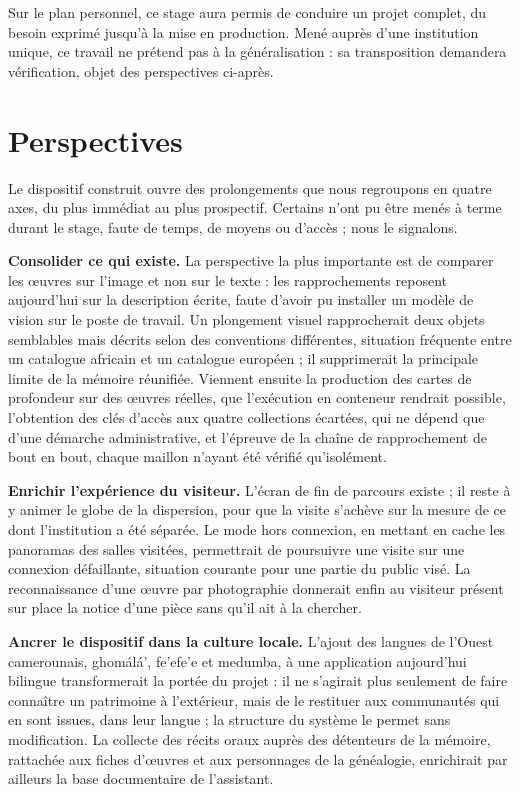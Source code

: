 Sur le plan personnel, ce stage aura permis de conduire un projet complet, du
besoin exprimé jusqu'à la mise en production. Mené auprès d'une institution
unique, ce travail ne prétend pas à la généralisation : sa transposition
demandera vérification, objet des perspectives ci-après.


\section*{Perspectives}

Le dispositif construit ouvre des prolongements que nous regroupons en quatre
axes, du plus immédiat au plus prospectif. Certains n'ont pu être menés à terme
durant le stage, faute de temps, de moyens ou d'accès ; nous le signalons.

\textbf{Consolider ce qui existe.} La perspective la plus importante est de
comparer les œuvres sur l'image et non sur le texte : les rapprochements
reposent aujourd'hui sur la description écrite, faute d'avoir pu installer un
modèle de vision sur le poste de travail. Un plongement visuel rapprocherait
deux objets semblables mais décrits selon des conventions différentes, situation
fréquente entre un catalogue africain et un catalogue européen ; il supprimerait
la principale limite de la mémoire réunifiée. Viennent ensuite la production des
cartes de profondeur sur des œuvres réelles, que l'exécution en conteneur
rendrait possible, l'obtention des clés d'accès aux quatre collections écartées,
qui ne dépend que d'une démarche administrative, et l'épreuve de la chaîne de
rapprochement de bout en bout, chaque maillon n'ayant été vérifié qu'isolément.

\textbf{Enrichir l'expérience du visiteur.} L'écran de fin de parcours existe ;
il reste à y animer le globe de la dispersion, pour que la visite s'achève sur
la mesure de ce dont l'institution a été séparée. Le mode hors connexion, en
mettant en cache les panoramas des salles visitées, permettrait de poursuivre
une visite sur une connexion défaillante, situation courante pour une partie du
public visé. La reconnaissance d'une œuvre par photographie donnerait enfin au
visiteur présent sur place la notice d'une pièce sans qu'il ait à la chercher.

\textbf{Ancrer le dispositif dans la culture locale.} L'ajout des langues de
l'Ouest camerounais, ghomálá', fe'efe'e et medumba, à une application
aujourd'hui bilingue transformerait la portée du projet : il ne s'agirait plus
seulement de faire connaître un patrimoine à l'extérieur, mais de le restituer
aux communautés qui en sont issues, dans leur langue ; la structure du système
le permet sans modification. La collecte des récits oraux auprès des détenteurs
de la mémoire, rattachée aux fiches d'œuvres et aux personnages de la
généalogie, enrichirait par ailleurs la base documentaire de l'assistant.

